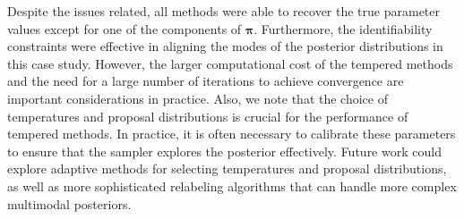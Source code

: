 \documentclass[11pt]{article}
\newcommand{\bpi}{\boldsymbol{\pi}}
\begin{document}
Despite the issues related, all methods were able to recover the true parameter values except for one of the 
components of $\bpi$. Furthermore, the identifiability constraints were effective in aligning the modes of the
posterior distributions in this case study. However, the larger computational cost of the tempered methods
and the need for a large number of iterations to achieve convergence are important considerations in practice. 
Also, we note that the choice of temperatures and proposal distributions is crucial for the performance of
tempered methods. In practice, it is often necessary to calibrate these parameters to ensure that the
sampler explores the posterior effectively. Future work could explore adaptive methods for selecting
temperatures and proposal distributions, as well as more sophisticated relabeling algorithms that can handle
more complex multimodal posteriors.

\clearpage



\end{document}
